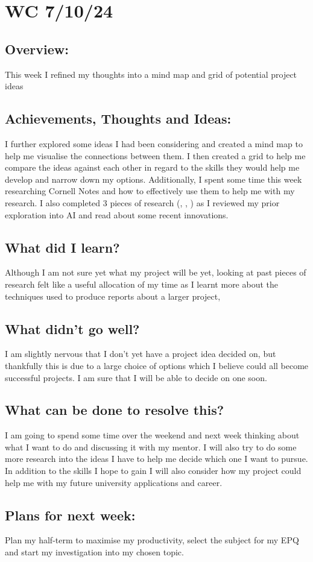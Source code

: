 \section{WC 7/10/24}

\subsection*{Overview:}

 This week I refined my thoughts into a mind map and grid of potential project ideas
\subsection*{Achievements, Thoughts and Ideas:}

I further explored some ideas I had been considering and created a mind map to help me visualise the connections between them. I then created a grid to help me compare the ideas against each other in regard to the skills they would help me develop and narrow down my options. Additionally, I spent some time this week researching Cornell Notes and how to effectively use them to help me with my research.
I also completed 3 pieces of research (, , ) as I reviewed my prior exploration into AI and read about some recent innovations. 

\subsection*{What did I learn?}
Although I am not sure yet what my project will be yet, looking at past pieces of research felt like a useful allocation of my time as I learnt more about the techniques used to produce reports about a larger project, 

\subsection*{What didn't go well?}
I am slightly nervous that I don't yet have a project idea decided on, but thankfully this is due to a large choice of options which I believe could all become successful projects. I am sure that I will be able to decide on one soon.

\subsection*{What can be done to resolve this?}
I am going to spend some time over the weekend and next week thinking about what I want to do and discussing it with my mentor. I will also try to do some more research into the ideas I have to help me decide which one I want to pursue. In addition to the skills I hope to gain I will also consider how my project could help me with my future university applications and career.

\subsection*{Plans for next week:}
Plan my half-term to maximise my productivity, select the subject for my EPQ and start my investigation into my chosen topic.
